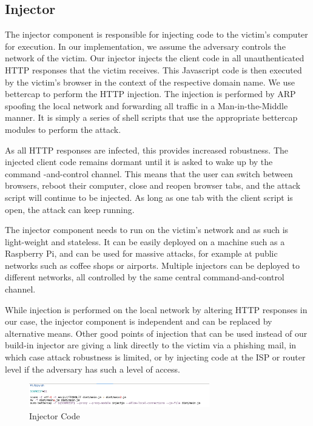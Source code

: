 \subsection{Injector}
The injector component is responsible for injecting code to the victim's
computer for execution. In our implementation, we assume the adversary controls
the network of the victim. Our injector injects the client code in all
unauthenticated HTTP responses that the victim receives. This Javascript code
is then executed by the victim's browser in the context of the respective
domain name. We use bettercap \cite{bettercap}  to perform the HTTP
injection. The injection is performed by ARP spoofing the local network and
forwarding all traffic in a Man-in-the-Middle manner. It is simply a series of
shell scripts that use the appropriate bettercap modules to perform the attack.

As all HTTP responses are infected, this provides increased robustness.
The injected client code remains dormant until it is asked to wake
up by the command -and-control channel. This means that the user can switch
between browsers, reboot their computer, close and reopen browser tabs, and the
attack script will continue to be injected. As long as one tab with the client
script is open, the attack can keep running.

The injector component needs to run on the victim's network and as such is
light-weight and stateless. It can be easily deployed on a machine such as a
Raspberry Pi, and can be used for massive attacks, for example at public
networks such as coffee shops or airports. Multiple injectors can
be deployed to different networks, all controlled by the same central
command-and-control channel.

While injection is performed on the local network by altering HTTP
responses in our case, the injector component is independent and can be
replaced by alternative means. Other good points of injection that can be used
instead of our build-in injector are giving a link directly to the victim via a
phishing mail, in which case attack robustness is limited, or by injecting code
at the ISP or router level if the adversary has such a level of access.


\begin{figure}[H] \caption{Injector Code} \centering
\includegraphics[width=0.7\textwidth]{diagrams/injector.png}\end{figure}


